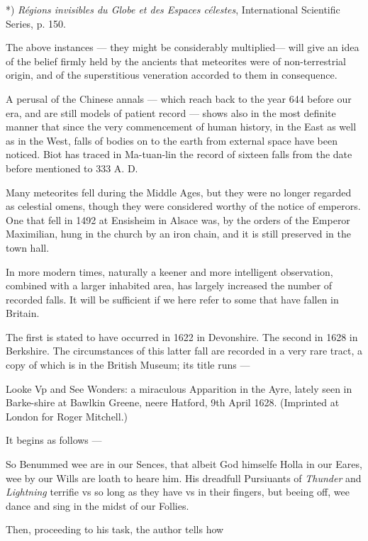 \documentclass[a4paper, 12pt, oneside, polutonikogreek, english]{article}
\begin{document}
*) \emph{Régions invisibles du Globe et des Espaces célestes}, International Scientific Series, p. 150.

The above instances --- they might be considerably multiplied--- will give an idea of the belief firmly held by the ancients that meteorites were of non-terrestrial origin, and of the superstitious veneration accorded to them in consequence.

A perusal of the Chinese annals --- which reach back to the year 644 before our era, and are still models of patient record --- shows also in the most definite manner that since the very commencement of human history, in the East as well as in the West, falls of bodies on to the earth from external space have been noticed. Biot has traced in Ma-tuan-lin the record of sixteen falls from the date before mentioned to 333 A. D.

Many meteorites fell during the Middle Ages, but they were no longer regarded as celestial omens, though they were considered worthy of the notice of emperors. One that fell in 1492 at Ensisheim in Alsace was, by the orders of the Emperor Maximilian, hung in the church by an iron chain, and it is still preserved in the town hall.

In more modern times, naturally a keener and more intelligent observation, combined with a larger inhabited area, has largely increased the number of recorded falls. It will be sufficient if we here refer to some that have fallen in Britain.

The first is stated to have occurred in 1622 in Devonshire. The second in 1628 in Berkshire. The circumstances of this latter fall are recorded in a very rare tract, a copy of which is in the British Museum; its title runs ---

Looke Vp and See Wonders: a miraculous Apparition in the Ayre, lately seen in Barke-shire at Bawlkin Greene, neere Hatford, 9th April 1628. (Imprinted at London for Roger Mitchell.)

It begins as follows ---

So Benummed wee are in our Sences, that albeit God himselfe Holla in our Eares, wee by our Wills are loath to heare him. His dreadfull Pursiuants of \emph{Thunder} and \emph{Lightning} terrifie vs so long as they have vs in their fingers, but beeing off, wee dance and sing in the midst of our Follies.

Then, proceeding to his task, the author tells how
\end{document}
